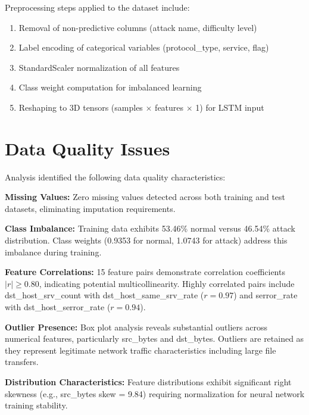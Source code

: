 \documentclass[12pt,a4paper]{report}
\begin{document}
Preprocessing steps applied to the dataset include:
\begin{enumerate}
    \item Removal of non-predictive columns (attack name, difficulty level)
    \item Label encoding of categorical variables (protocol\_type, service, flag)
    \item StandardScaler normalization of all features
    \item Class weight computation for imbalanced learning
    \item Reshaping to 3D tensors (samples $\times$ features $\times$ 1) for LSTM input
\end{enumerate}

\section{Data Quality Issues}

Analysis identified the following data quality characteristics:

\textbf{Missing Values:} Zero missing values detected across both training and test datasets, eliminating imputation requirements.

\textbf{Class Imbalance:} Training data exhibits 53.46\% normal versus 46.54\% attack distribution. Class weights (0.9353 for normal, 1.0743 for attack) address this imbalance during training.

\textbf{Feature Correlations:} 15 feature pairs demonstrate correlation coefficients $|r| \geq 0.80$, indicating potential multicollinearity. Highly correlated pairs include dst\_host\_srv\_count with dst\_host\_same\_srv\_rate ($r = 0.97$) and serror\_rate with dst\_host\_serror\_rate ($r = 0.94$).

\textbf{Outlier Presence:} Box plot analysis reveals substantial outliers across numerical features, particularly src\_bytes and dst\_bytes. Outliers are retained as they represent legitimate network traffic characteristics including large file transfers.

\textbf{Distribution Characteristics:} Feature distributions exhibit significant right skewness (e.g., src\_bytes skew = 9.84) requiring normalization for neural network training stability.
\end{document}

